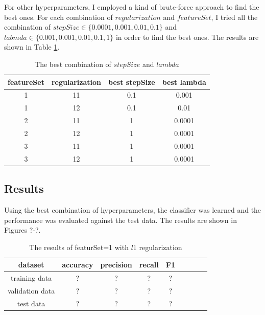 For other hyperparameters, I employed a kind of brute-force approach to find the best ones. For each combination of $regularization$ and $featureSet$, I tried all the combination of $stepSize \in \{0.0001, 0.001, 0.01, 0.1\}$ and $labmda \in \{0.001, 0.001, 0.01, 0.1, 1\}$ in order to find the best ones. The results are shown in Table \ref{tab:best_hyperparameters}.

\begin{table}[htb]
  \begin{center}
  \begin{tabular}{|c|c||c|c|} \hline
    featureSet & regularization & best stepSize & best  lambda \\ \hline
    1 & 11 & 0.1 & 0.001 \\ \hline
    1 & 12 & 0.1 & 0.01 \\ \hline
    2 & 11 & 1 & 0.0001 \\ \hline
    2 & 12 & 1 & 0.0001 \\ \hline
    3 & 11 & 1 & 0.0001 \\ \hline
    3 & 12 & 1 & 0.0001 \\ \hline
  \end{tabular}
  \caption{The best combination of $stepSize$ and $lambda$}
  \label{tab:best_hyperparameters}
  \end{center}
\end{table}

\subsection*{Results}
Using the best combination of hyperparameters, the classifier was learned and the performance was evaluated against the test data. The results are shown in Figures ?-?.

\begin{table}[htb]
  \begin{center}
  \begin{tabular}{|c|c|c|c|c|c|c|c|c|} \hline
    dataset & accuracy & precision & recall & F1 \\ \hline
    training data & ? & ? & ? & ? \\ \hline
    validation data & ? & ? & ? & ? \\ \hline
    test data & ? & ? & ? & ? \\ \hline
  \end{tabular}
  \caption{The results of featurSet=1 with $l1$ regularization}
  \label{tab:result_1_l1}
  \end{center}
\end{table}

